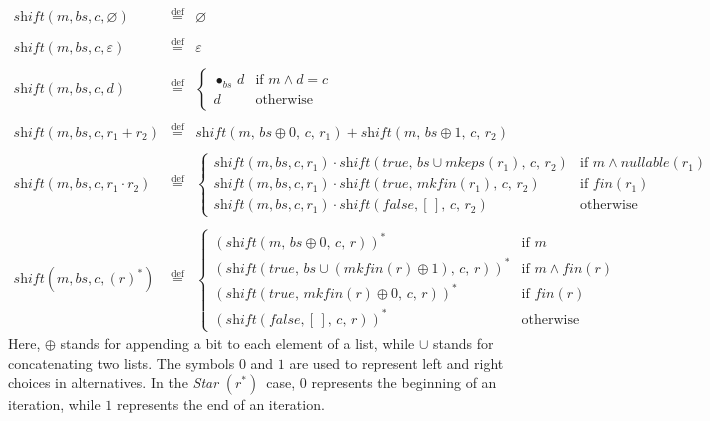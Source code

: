 \documentclass[12pt]{article}
\newcommand{\shift}{\textit{shift}}
\newcommand{\mkeps}{\textit{mkeps}}
\newcommand{\fin}{\textit{fin}}
\newcommand{\nullable}{\textit{nullable}}
\newcommand{\mkfin}{\textit{mkfin}}
\newcommand{\STARText}{\textit{Star} $(r^*)$}
\newcommand{\emptylist}{[\,]}
\begin{document}
\[
\begin{array}{rcl}
  \shift(m,bs,c,\varnothing)              & \stackrel{\text{def}}{=} & \varnothing \\\\
  \shift(m,bs,c,\varepsilon)              & \stackrel{\text{def}}{=} & \varepsilon \\\\
  \shift(m,bs,c,d)                        & \stackrel{\text{def}}{=} & 
   \begin{cases}
    \bullet_{bs} \, d & \text{if $m \land d = c$}\\
    d                 & \text{otherwise}
   \end{cases} \\\\

  \shift(m,bs,c, r_1 + r_2)     & \stackrel{\text{def}}{=} & 
    \shift(m,\, bs \oplus 0,\, c,\, r_1) + \shift(m,\, bs \oplus 1,\, c,\, r_2) \\\\
  
  \shift(m,bs,c, r_1 \cdot r_2) & \stackrel{\text{def}}{=} &
  \begin{cases}
      \shift(m,bs,c,r_1) \cdot \shift(true,\, bs \cup \mkeps(r_1),\, c,\, r_2) & \text{if $m \land \nullable(r_1)$}\\
      \shift(m,bs,c,r_1) \cdot \shift(true,\, \mkfin(r_1),\, c,\, r_2)         & \text{if $\fin(r_1)$}\\
      \shift(m,bs,c,r_1) \cdot \shift(false, \emptylist,\, c,\, r_2)           & \text{otherwise} 
    \end{cases}  \\\\

  \shift(m,bs,c,(r)^*)          & \stackrel{\text{def}}{=} &
    \begin{cases}
      (\shift(m,\, bs \oplus 0,\, c,\, r))^*                     & \text{if $m$} \\
      (\shift(true,\, bs \cup (\mkfin(r) \oplus 1),\, c,\, r))^* & \text{if $m \land \fin(r)$} \\
      (\shift(true,\, \mkfin(r) \oplus 0,\, c,\, r))^*           & \text{if $\fin(r)$} \\
      (\shift(false, \emptylist,\, c,\, r))^*                    & \text{otherwise}
    \end{cases}
\end{array}
\]
Here, $\oplus$ stands for appending a bit to each element of a list, while $\cup$ stands for concatenating two lists.  
The symbols $0$ and $1$ are used to represent left and right choices in alternatives.  
In the \STARText\ case, $0$ represents the beginning of an iteration, while $1$ represents the end of an iteration.
\end{document}
